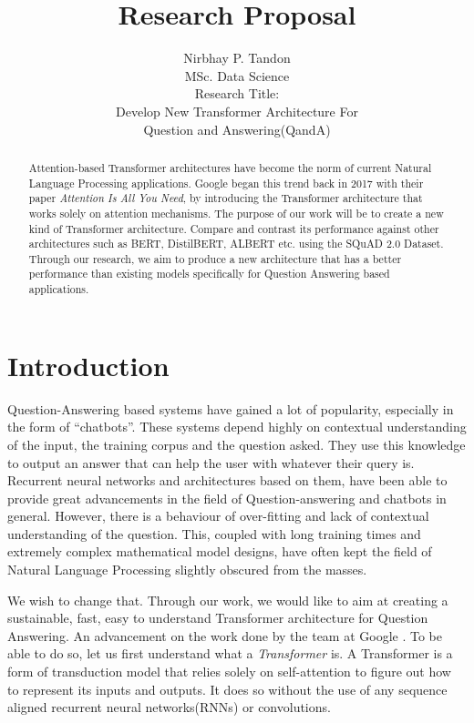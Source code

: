 \documentclass[11pt]{article}
\begin{document}
	\title{Research Proposal}

	\author{Nirbhay P. Tandon\\MSc. Data Science\\
		Research Title:\\Develop New Transformer Architecture For \\ Question and Answering(QandA)
	}
	\date{}
	\maketitle

	\newpage
	\begin{abstract}
		Attention-based Transformer architectures have become the norm of current Natural Language Processing applications. Google began this trend back in 2017 with their paper \textit{Attention Is All You Need}, by introducing the Transformer architecture that works solely on attention mechanisms. The purpose of our work will be to create a new kind of Transformer architecture. Compare and contrast its performance against other architectures such as BERT, DistilBERT, ALBERT etc. using the SQuAD 2.0 Dataset. Through our research, we aim to produce a new architecture that has a better performance than existing models specifically for Question Answering based applications.
	\end{abstract}
	\newpage
	\tableofcontents
	\newpage
	\listoffigures
	\newpage
	\section{Introduction}\label{introduction}

	Question-Answering based systems have gained a lot of popularity, especially in the form of ``chatbots''. These systems depend highly on contextual understanding of the input, the training corpus and the question asked. They use this knowledge to output an answer that can help the user with whatever their query is. Recurrent neural networks and architectures based on them, have been able to provide great advancements in the field of Question-answering and chatbots in general. However, there is a behaviour of over-fitting and lack of contextual understanding of the question. This, coupled with long training times and extremely complex mathematical model designs, have often kept the field of Natural Language Processing slightly obscured from the masses.

	We wish to change that. Through our work, we would like to aim at creating a sustainable, fast, easy to understand Transformer architecture for Question Answering. An advancement on the work done by the team at Google \citep{atayl}. To be able to do so, let us first understand what a \textit{Transformer} is.
    A Transformer is a form of transduction model that relies solely on self-attention to figure out how to represent its inputs and outputs. It does so without the use of any sequence aligned recurrent neural networks(RNNs) or convolutions.
\end{document}

